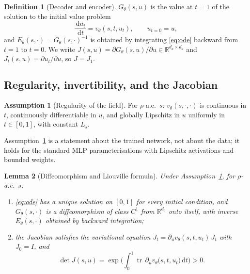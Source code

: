 \documentclass[11pt]{article}
\theoremstyle{plain}
\newtheorem{lemma}{Lemma}[section]
\theoremstyle{definition}
\newtheorem{definition}[lemma]{Definition}
\newtheorem{assumption}{Assumption}
\theoremstyle{remark}
\newcommand{\R}{\mathbb R}
\newcommand{\1}{\mathbf 1}
\newcommand{\tr}{\operatorname{tr}}
\newcommand{\dd}{\,\mathrm d}
\newcommand{\Gth}{G_\theta}
\newcommand{\Eth}{E_\theta}
\begin{document}
\begin{definition}[Decoder and encoder]
\label{def:decoder}
$\Gth(s,u)$ is the value at $t=1$ of the solution to the initial value problem
\begin{equation}
\label{eq:ode}
  \frac{\dd u_t}{\dd t}=v_\theta(s,t,u_t),\qquad u_{t=0}=u,
\end{equation}
and $\Eth(s,\cdot)=\Gth(s,\cdot)^{-1}$ is obtained by integrating \eqref{eq:ode} backward
from $t=1$ to $t=0$. We write $J(s,u)=\partial\Gth(s,u)/\partial u\in\R^{d_a\times d_a}$
and $J_t(s,u)=\partial u_t/\partial u$, so $J=J_1$.
\end{definition}

\subsection{Regularity, invertibility, and the Jacobian}

\begin{assumption}[Regularity of the field]
\label{ass:lipschitz}
For $\rho$-a.e.\ $s$: $v_\theta(s,\cdot,\cdot)$ is continuous in $t$, continuously
differentiable in $u$, and globally Lipschitz in $u$ uniformly in $t\in[0,1]$, with
constant $L_s$.
\end{assumption}

\noindent
Assumption~\ref{ass:lipschitz} is a statement about the trained network, not about the
data; it holds for the standard MLP parameterisations with Lipschitz activations and
bounded weights.

\begin{lemma}[Diffeomorphism and Liouville formula]
\label{lem:diffeo}
Under Assumption~\ref{ass:lipschitz}, for $\rho$-a.e.\ $s$:
\begin{enumerate}
\item[(i)] \eqref{eq:ode} has a unique solution on $[0,1]$ for every initial condition,
  and $\Gth(s,\cdot)$ is a diffeomorphism of class $C^1$ from $\R^{d_a}$ \emph{onto} itself,
  with inverse $\Eth(s,\cdot)$ obtained by backward integration;
\item[(ii)] the Jacobian satisfies the variational equation
  $\dot J_t=\partial_u v_\theta(s,t,u_t)\,J_t$ with $J_0=I$, and
  \begin{equation}
  \label{eq:liouville}
    \det J(s,u)=\exp\Big(\int_0^1\tr\,\partial_u v_\theta\big(s,t,u_t\big)\dd t\Big)>0 .
  \end{equation}
\end{enumerate}
\end{lemma}
\end{document}
